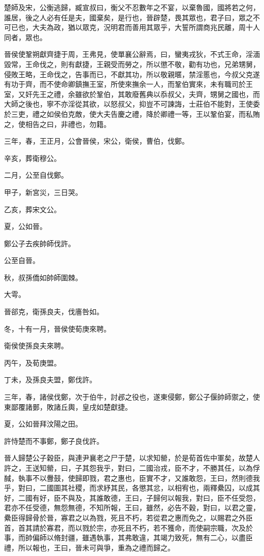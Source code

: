 \begin{pinyinscope}
楚師及宋，公衡逃歸，臧宣叔曰，衡父不忍數年之不宴，以棄魯國，國將若之何，誰居，後之人必有任是夫，國棄矣，是行也，晉辟楚，畏其眾也，君子曰，眾之不可已也，大夫為政，猶以眾克，況明君而善用其眾乎，大誓所謂商兆民離，周十人同者，眾也。

晉侯使鞏朔獻齊捷于周，王弗見，使單襄公辭焉，曰，蠻夷戎狄，不式王命，淫湎毀常，王命伐之，則有獻捷，王親受而勞之，所以懲不敬，勸有功也，兄弟甥舅，侵敗王略，王命伐之，告事而已，不獻其功，所以敬親暱，禁淫慝也，今叔父克遂有功于齊，而不使命卿鎮撫王室，所使來撫余一人，而鞏伯實來，未有職司於王室，又奸先王之禮，余雖欲於鞏伯，其敢廢舊典以忝叔父，夫齊，甥舅之國也，而大師之後也，寧不亦淫從其欲，以怒叔父，抑豈不可諫誨，士莊伯不能對，王使委於三吏，禮之如侯伯克敵，使大夫告慶之禮，降於卿禮一等，王以鞏伯宴，而私賄之，使相告之曰，非禮也，勿籍。

三年，春，王正月，公會晉侯，宋公，衛侯，曹伯，伐鄭。

辛亥，葬衛穆公。

二月，公至自伐鄭。

甲子，新宮災，三日哭。

乙亥，葬宋文公。

夏，公如晉。

鄭公子去疾帥師伐許。

公至自晉。

秋，叔孫僑如帥師圍棘。

大雩。

晉郤克，衛孫良夫，伐廧咎如。

冬，十有一月，晉侯使荀庚來聘。

衛侯使孫良夫來聘。

丙午，及荀庚盟。

丁未，及孫良夫盟，鄭伐許。

三年，春，諸侯伐鄭，次于伯牛，討邲之役也，遂東侵鄭，鄭公子偃帥師禦之，使東鄙覆諸鄤，敗諸丘輿，皇戌如楚獻捷。

夏，公如晉拜汶陽之田。

許恃楚而不事鄭，鄭子良伐許。

晉人歸楚公子穀臣，與連尹襄老之尸于楚，以求知罃，於是荀首佐中軍矣，故楚人許之，王送知罃，曰，子其怨我乎，對曰，二國治戎，臣不才，不勝其任，以為俘馘，執事不以釁鼓，使歸即戮，君之惠也，臣實不才，又誰敢怨，王曰，然則德我乎，對曰，二國圖其社稷，而求紓其民，各懲其忿，以相宥也，兩釋纍囚，以成其好，二國有好，臣不與及，其誰敢德，王曰，子歸何以報我，對曰，臣不任受怨，君亦不任受德，無怨無德，不知所報，王曰，雖然，必告不穀，對曰，以君之靈，纍臣得歸骨於晉，寡君之以為戮，死且不朽，若從君之惠而免之，以賜君之外臣首，首其請於寡君，而以戮於宗，亦死且不朽，若不獲命，而使嗣宗職，次及於事，而帥偏師以脩封疆，雖遇執事，其弗敢違，其竭力致死，無有二心，以盡臣禮，所以報也，王曰，晉未可與爭，重為之禮而歸之。


\end{pinyinscope}
